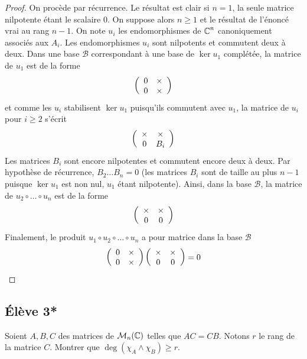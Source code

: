 \documentclass[10pt]{scrartcl}
\begin{document}
    \begin{proof}
        On procède par récurrence. 
        Le résultat est clair si $n=1$, la seule matrice nilpotente étant le scalaire $0$. 
        On suppose alors $n\geq 1$ et le résultat de l'énoncé vrai au rang $n-1$. 
        On note $u_i$ les endomorphismes de $\operatorname{\mathbb C}^n$ canoniquement associés aux $A_i$. 
        Les endomorphismes $u_i$ sont nilpotents et commutent deux à deux. 
        Dans une base $\mathcal B$ correspondant à une base de $\ker u_1$ complétée, la 
        matrice de $u_1$ est de la forme
        \[
            \left(\begin{array}{c c} 0 & \times\\ 0 & \times\end{array}\right)
        \]
        et comme les $u_i$ stabilisent $\ker u_1$ puisqu'ils commutent avec $u_1$,
        la matrice de $u_i$ pour $i\geq 2$ s'écrit 
        \[
            \left(\begin{array}{c c} \times & \times\\ 0 & B_i\end{array}\right)
        \]
        Les matrices $B_i$ sont encore nilpotentes et commutent encore deux à deux. 
        Par hypothèse de récurrence, $B_2\dots B_n=0$ (les matrices $B_i$ sont de taille au 
        plus $n-1$ puisque $\ker u_1$ est non nul, $u_1$ étant nilpotente). 
        Ainsi, dans la base $\mathcal B$, la matrice de $u_2\circ\dots\circ u_n$ est de la forme 
        \[
            \left(\begin{array}{c c} \times & \times\\ 0 & 0\end{array}\right)
        \]
        Finalement, le produit $u_1\circ u_2\circ \dots\circ u_n$ a pour matrice dans la base $\mathcal B$ 
        \[
            \left(\begin{array}{c c} 0 & \times\\ 0 & \times\end{array}\right)\left(\begin{array}{c c} \times & \times\\ 0 & 0\end{array}\right)=0
        \]
    \end{proof}

    \subsection*{Élève 3*}
    \begin{exo}
        Soient $A,B,C$ des matrices de $\mathcal M_n(\operatorname{\mathbb C})$ telles que $AC=CB$. 
        Notons $r$ le rang de la matrice $C$. 
        Montrer que $\deg(\chi_A\wedge\chi_B)\geq r$.
    \end{exo}
    
\end{document}
